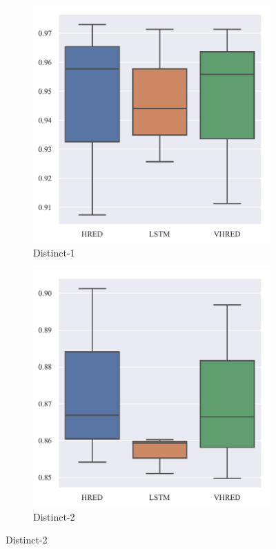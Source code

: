 \begin{figure}[H]
    \begin{subfigure}{0.5\linewidth}
        \centering
        \includegraphics[width=\linewidth]{figure/boxplot/model/distinct_1/plot.pdf}
        \caption{Distinct-1}
        \label{fig:distinct_1_model}
    \end{subfigure}%
    \begin{subfigure}{0.5\linewidth}
        \centering
        \includegraphics[width=\linewidth]{figure/boxplot/model/distinct_2/plot.pdf}
        \caption{Distinct-2}
        \label{fig:distinct_2_model}
    \end{subfigure}


\end{figure}
